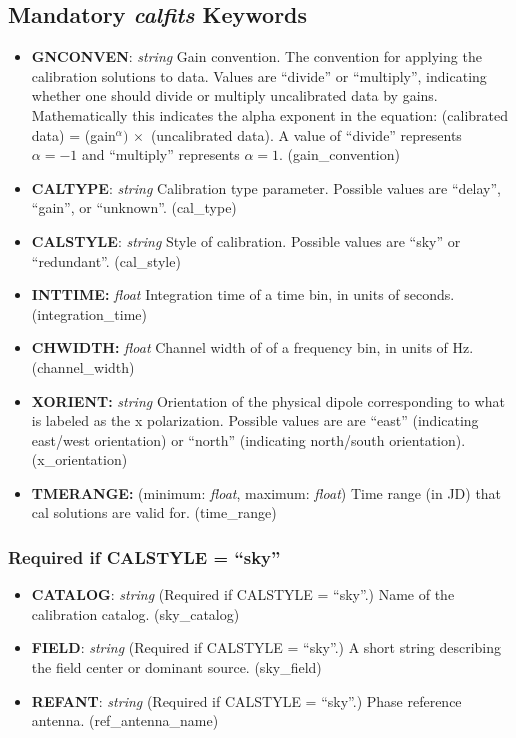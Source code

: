 \documentclass[11pt, oneside, english]{article}   	%
\begin{document}
	
\subsection{Mandatory \emph{calfits} Keywords}
\begin{itemize}
\item{\textbf{GNCONVEN}: \emph{string} Gain convention. The convention for applying the calibration solutions to data.
Values are ``divide'' or ``multiply'', indicating whether one should divide or multiply uncalibrated data by gains. 
Mathematically this indicates the alpha exponent in the equation: 
    (calibrated data) = (gain$^{\alpha}) \,  \times $ (uncalibrated data). A value of
    ``divide'' represents $\alpha=-1$ and ``multiply'' represents $\alpha=1$. (gain\_convention)}
\item{\textbf{CALTYPE}: \emph{string} Calibration type parameter. Possible values are ``delay'', ``gain'', or ``unknown''. (cal\_type)}
\item{\textbf{CALSTYLE}: \emph{string} Style of calibration. Possible values are ``sky'' or ``redundant''. (cal\_style)}
\item{\textbf{INTTIME:} \emph{float} Integration time of a time bin, in units of seconds. (integration\_time)}
\item{\textbf{CHWIDTH:} \emph{float} Channel width of of a frequency bin, in units of Hz. (channel\_width)}
\item{\textbf{XORIENT:} \emph{string} Orientation of the physical dipole corresponding to what is labeled as the x polarization. Possible values are are ``east'' (indicating east/west orientation) or ``north'' (indicating north/south orientation). (x\_orientation)}
\item{\textbf{TMERANGE:} (minimum: \emph{float}, maximum: \emph{float}) Time range (in JD) that cal solutions are valid for. (time\_range)}
\end{itemize}

	\subsubsection{Required if CALSTYLE = ``sky''}
	\begin{itemize}
	\item{\textbf{CATALOG}: \emph{string} (Required if CALSTYLE = ``sky''.) Name of the calibration catalog. (sky\_catalog)}
	\item{\textbf{FIELD}: \emph{string} (Required if CALSTYLE = ``sky''.) A short string describing the field center or dominant source. (sky\_field)}
	\item{\textbf{REFANT}: \emph{string} (Required if CALSTYLE = ``sky''.) Phase reference antenna. (ref\_antenna\_name)}
	\end{itemize}
	
\end{document}
